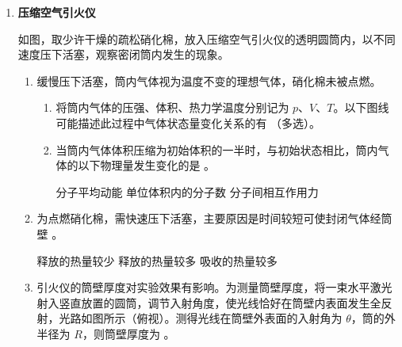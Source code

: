\documentclass[\gkver]{gaokaozhenti}
\begin{document}
\begin{enumerate}
{$f = \frac{1}{T} = \frac{1}{3.8 \times 10^{-3}}\UHz \approx 263\UHz$

磁通量变化部分的最大值为 $\Phi_{m} = \frac{1.095 - 0.905}{2}\UuWb = 0.095\UuWb$，感应电动势的最大值

$E_{m} = N\omega\Phi_{m} = 2\pi fN\Phi_{m} = 2\pi \times 263 \times 500 \times 0.095 \times 10^{-6}\UV \approx 0.0785\UV$
}

\item
\textbf{压缩空气引火仪}

如图，取少许干燥的疏松硝化棉，放入压缩空气引火仪的透明圆筒内，以不同速度压下活塞，观察密闭筒内发生的现象。

\onepicture[h=4.5cm, align=right]{}
\begin{enumerate}
	\item
	缓慢压下活塞，筒内气体视为温度不变的理想气体，硝化棉未被点燃。

	\begin{enumerate}
		\item
		将筒内气体的压强、体积、热力学温度分别记为 $p$、$V$、$T$。以下图线可能描述此过程中气体状态量变化关系的有 （多选）。

		\onepicture[w=13cm, align=right]{}

		\item
		当筒内气体体积压缩为初始体积的一半时，与初始状态相比，筒内气体的以下物理量发生变化的是 。

		{分子平均动能}
		{单位体积内的分子数}
		{分子间相互作用力}
	\end{enumerate}

	\item
	为点燃硝化棉，需快速压下活塞，主要原因是时间较短可使封闭气体经筒壁 。

	{释放的热量较少}
	{释放的热量较多}
	{吸收的热量较多}

	\item
	引火仪的筒壁厚度对实验效果有影响。为测量筒壁厚度，将一束水平激光射入竖直放置的圆筒，调节入射角度，使光线恰好在筒壁内表面发生全反射，光路如图所示（俯视）。测得光线在筒壁外表面的入射角为 $\theta$，筒的外半径为 $R$，则筒壁厚度为 。

	\onepicture[h=4.5cm, align=right]{}
\end{enumerate}
\end{enumerate}
\end{document}

